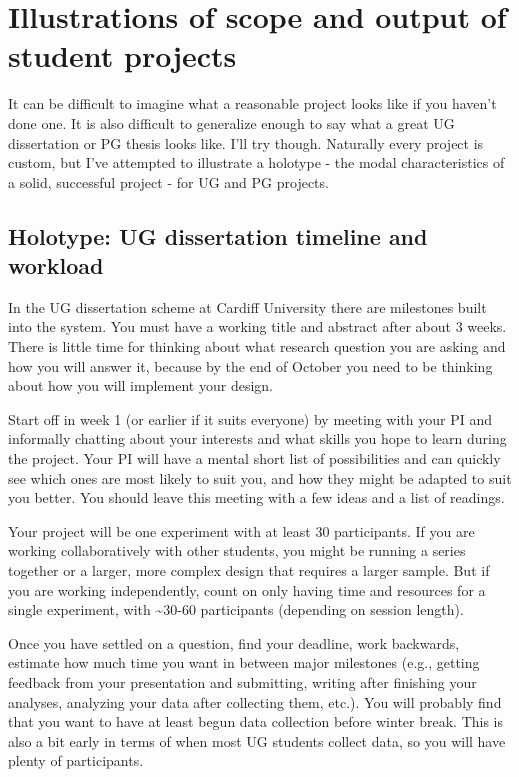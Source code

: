 \documentclass[
  12pt,
]{book}
\begin{document}
\section{Illustrations of scope and output of student projects}\label{illustrations-of-scope-and-output-of-student-projects}

It can be difficult to imagine what a reasonable project looks like if you haven't done one. It is also difficult to generalize enough to say what a great UG dissertation or PG thesis looks like. I'll try though. Naturally every project is custom, but I've attempted to illustrate a holotype - the modal characteristics of a solid, successful project - for UG and PG projects.

\subsection{Holotype: UG dissertation timeline and workload}\label{holotype-ug-dissertation-timeline-and-workload}

In the UG dissertation scheme at Cardiff University there are milestones built into the system. You must have a working title and abstract after about 3 weeks. There is little time for thinking about what research question you are asking and how you will answer it, because by the end of October you need to be thinking about how you will implement your design.

Start off in week 1 (or earlier if it suits everyone) by meeting with your PI and informally chatting about your interests and what skills you hope to learn during the project. Your PI will have a mental short list of possibilities and can quickly see which ones are most likely to suit you, and how they might be adapted to suit you better. You should leave this meeting with a few ideas and a list of readings.

Your project will be one experiment with at least 30 participants. If you are working collaboratively with other students, you might be running a series together or a larger, more complex design that requires a larger sample. But if you are working independently, count on only having time and resources for a single experiment, with \textasciitilde30-60 participants (depending on session length).

Once you have settled on a question, find your deadline, work backwards, estimate how much time you want in between major milestones (e.g., getting feedback from your presentation and submitting, writing after finishing your analyses, analyzing your data after collecting them, etc.). You will probably find that you want to have at least begun data collection before winter break. This is also a bit early in terms of when most UG students collect data, so you will have plenty of participants.
\end{document}
